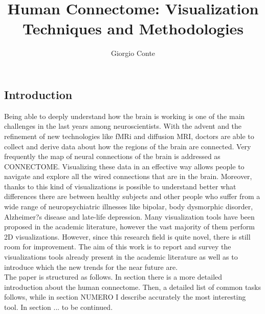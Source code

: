 \documentclass{article}
\title{Human Connectome: Visualization Techniques and Methodologies}
\author{Giorgio Conte}
\affil{Creative Coding Research Group\\ Department of Computer Science\\University of Illinois at Chicago}
\begin{document}
\maketitle
\begin{abstract}
\end{abstract}

\begin{multicols}{2}
\raggedcolumns

\section{Introduction}

Being able to deeply understand how the brain is working is one of the main challenges in the last years among neuroscientists. With the advent and the refinement of new technologies like fMRi and diffusion MRI, doctors are able to collect and derive data about how the regions of the brain are connected. Very frequently the map of neural connections of the brain is addressed as CONNECTOME.
Visualizing these data in an effective way allows people to navigate and explore all the wired connections that are in the brain. Moreover, thanks to this kind of visualizations is possible to understand better what differences there are between healthy subjects and other people who suffer from a wide range of neuropsychiatric illnesses like bipolar, body dysmorphic disorder, Alzheimer?s disease and late-life depression. 
Many visualization tools have been proposed in the academic literature, however the vast majority of them perform 2D visualizations. However, since this research field is quite novel, there is still room for improvement.
The aim of this work is to report and survey the visualizations tools already present in the academic literature as well as to introduce which the new trends for the near future are.\\
The paper is structured as follows. In section there is a more detailed introduction about the human connectome. Then, a detailed list of common tasks follows, while in section NUMERO I describe accurately the most interesting tool. In section ... to be continued.

\end{multicols}
\end{document}

